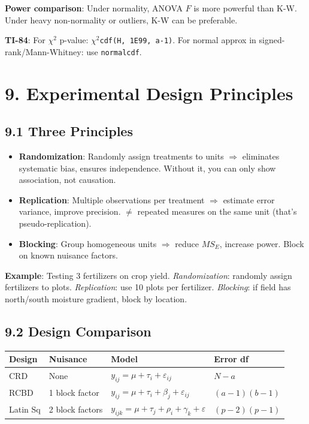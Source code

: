 \documentclass[9pt,letterpaper]{article}
\begin{document}
\textbf{Power comparison}: Under normality, ANOVA $F$ is more powerful than K-W. Under heavy non-normality or outliers, K-W can be preferable.

\begin{calcbox}
\textbf{TI-84}: For $\chi^2$ p-value: \texttt{$\chi^2$cdf(H, 1E99, a-1)}. For normal approx in signed-rank/Mann-Whitney: use \texttt{normalcdf}.
\end{calcbox}

\section{9. Experimental Design Principles}

\subsection{9.1 Three Principles}
\begin{itemize}
    \item \textbf{Randomization}: Randomly assign treatments to units $\Rightarrow$ eliminates systematic bias, ensures independence. Without it, you can only show association, not causation.
    \item \textbf{Replication}: Multiple observations per treatment $\Rightarrow$ estimate error variance, improve precision. $\neq$ repeated measures on the same unit (that's pseudo-replication).
    \item \textbf{Blocking}: Group homogeneous units $\Rightarrow$ reduce $MS_E$, increase power. Block on known nuisance factors.
\end{itemize}

\textbf{Example}: Testing 3 fertilizers on crop yield. \emph{Randomization}: randomly assign fertilizers to plots. \emph{Replication}: use 10 plots per fertilizer. \emph{Blocking}: if field has north/south moisture gradient, block by location.

\subsection{9.2 Design Comparison}

\begin{center}\small
\begin{tabular}{@{}p{1.6cm}p{2.2cm}p{2.8cm}p{2.5cm}@{}}
\toprule
\textbf{Design} & \textbf{Nuisance} & \textbf{Model} & \textbf{Error df} \\
\midrule
CRD & None & $y_{ij}=\mu+\tau_i+\varepsilon_{ij}$ & $N-a$ \\
RCBD & 1 block factor & $y_{ij}=\mu+\tau_i+\beta_j+\varepsilon_{ij}$ & $(a-1)(b-1)$ \\
Latin Sq & 2 block factors & $y_{ijk}=\mu+\tau_j+\rho_i+\gamma_k+\varepsilon$ & $(p-2)(p-1)$ \\
\bottomrule
\end{tabular}
\end{center}
\end{document}
